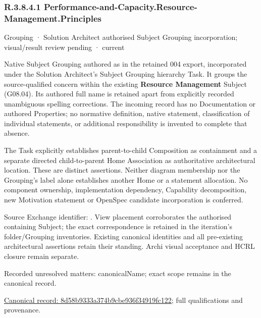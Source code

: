 \subsubsection*{R.3.8.4.1 Performance-and-Capacity.Resource-Management.Principles}
\label{navigation:R.3.8.4.1}

\label{element:8d58b9333a374b9cbe936f34919fc122}
{\small Grouping · Solution Architect authorised Subject Grouping incorporation; visual/result review pending · current}\par

Native Subject Grouping authored as \texttt{} in the retained 004 export,
incorporated under the Solution Architect's Subject Grouping hierarchy Task.
It groups the source-qualified \texttt{} concern within
the existing \textbf{Resource Management} Subject (G08.04). Its authored full name
is retained apart from explicitly recorded unambiguous spelling corrections.
The incoming record has no Documentation or authored Properties; no normative
definition, native statement, classification of individual statements, or
additional responsibility is invented to complete that absence.



The Task explicitly establishes parent-to-child Composition as containment and
a separate directed child-to-parent Home Association as authoritative architectural
location. These are distinct assertions. Neither diagram membership nor the
Grouping's label alone establishes another Home or a statement allocation.
No component ownership, implementation dependency, Capability decomposition,
new Motivation statement or OpenSpec candidate incorporation is conferred.



Source Exchange identifier: \texttt{}. View placement corroborates
the authorised containing Subject; the exact correspondence is retained in the
iteration's folder/Grouping inventories. Existing canonical identities and all
pre-existing architectural assertions retain their standing. Archi visual
acceptance and HCRL closure remain separate.


{\small Recorded unresolved matters: canonicalName; exact scope remains in the canonical record.}\par
{\footnotesize \href{../../../../continuum/grouping/8d58b9333a374b9cbe936f34919fc122.md}{Canonical record: 8d58b9333a374b9cbe936f34919fc122}; full qualifications and provenance.}\par

